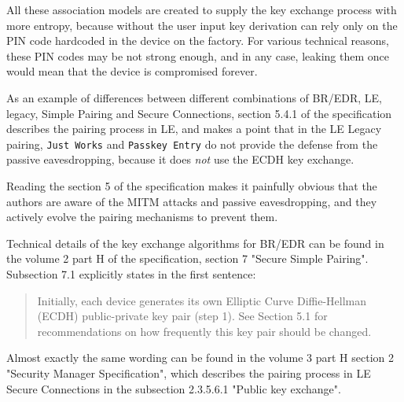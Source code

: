 All these association models are created to supply the key exchange process with more entropy, because without the user input key derivation can rely only on the PIN code hardcoded in the device on the factory.
For various technical reasons, these PIN codes may be not strong enough, and in any case, leaking them once would mean that the device is compromised forever.

As an example of differences between different combinations of BR/EDR, LE, legacy, Simple Pairing and Secure Connections, section 5.4.1 of the specification describes the pairing process in LE, and makes a point that in the LE Legacy pairing, \texttt{Just Works} and \texttt{Passkey Entry} do not provide the defense from the passive eavesdropping, because it does \textit{not} use the ECDH key exchange.

Reading the section 5 of the specification makes it painfully obvious that the authors are aware of the MITM attacks and passive eavesdropping, and they actively evolve the pairing mechanisms to prevent them.

Technical details of the key exchange algorithms for BR/EDR can be found in the volume 2 part H of the specification, section 7 "Secure Simple Pairing".
Subsection 7.1 explicitly states in the first sentence:

\begin{quote}
    Initially, each device generates its own Elliptic Curve Diffie-Hellman (ECDH) public-private key pair (step 1).
    See Section 5.1 for recommendations on how frequently this key pair should be changed.
\end{quote}

Almost exactly the same wording can be found in the volume 3 part H section 2 "Security Manager Specification", which describes the pairing process in LE Secure Connections in the subsection 2.3.5.6.1 "Public key exchange".